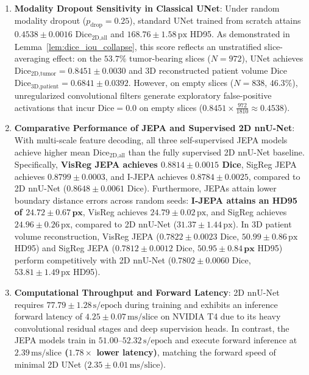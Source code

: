 \documentclass{article}
\begin{document}
\begin{enumerate}
    \item \textbf{Modality Dropout Sensitivity in Classical UNet}: Under random modality dropout ($p_{\text{drop}} = 0.25$), standard UNet trained from scratch attains $0.4538 \pm 0.0016$ $\text{Dice}_{\text{2D,all}}$ and $168.76 \pm 1.58\,\text{px}$ HD95. As demonstrated in Lemma~\ref{lem:dice_iou_collapse}, this score reflects an unstratified slice-averaging effect: on the $53.7\%$ tumor-bearing slices ($N=972$), UNet achieves $\text{Dice}_{\text{2D,tumor}} = 0.8451 \pm 0.0030$ and 3D reconstructed patient volume Dice $\text{Dice}_{\text{3D,patient}} = 0.6841 \pm 0.0392$. However, on empty slices ($N=838$, $46.3\%$), unregularized convolutional filters generate exploratory false-positive activations that incur $\text{Dice} = 0.0$ on empty slices ($0.8451 \times \frac{972}{1810} \approx 0.4538$).
    
    \item \textbf{Comparative Performance of JEPA and Supervised 2D nnU-Net}: With multi-scale feature decoding, all three self-supervised JEPA models achieve higher mean $\text{Dice}_{\text{2D,all}}$ than the fully supervised 2D nnU-Net baseline. Specifically, \textbf{VisReg JEPA achieves $\mathbf{0.8814 \pm 0.0015}$ Dice}, SigReg JEPA achieves $0.8799 \pm 0.0003$, and I-JEPA achieves $0.8784 \pm 0.0025$, compared to 2D nnU-Net ($0.8648 \pm 0.0061$ Dice). Furthermore, JEPAs attain lower boundary distance errors across random seeds: \textbf{I-JEPA attains an HD95 of $\mathbf{24.72 \pm 0.67\,\text{px}}$}, VisReg achieves $24.79 \pm 0.02\,\text{px}$, and SigReg achieves $24.96 \pm 0.26\,\text{px}$, compared to 2D nnU-Net ($31.37 \pm 1.44\,\text{px}$). In 3D patient volume reconstruction, VisReg JEPA ($\mathbf{0.7822 \pm 0.0023}$ Dice, $50.99 \pm 0.86\,\text{px}$ HD95) and SigReg JEPA ($0.7812 \pm 0.0012$ Dice, $\mathbf{50.95 \pm 0.84\,\text{px}}$ HD95) perform competitively with 2D nnU-Net ($0.7802 \pm 0.0060$ Dice, $53.81 \pm 1.49\,\text{px}$ HD95).
    
    \item \textbf{Computational Throughput and Forward Latency}: 2D nnU-Net requires $77.79 \pm 1.28\,\text{s/epoch}$ during training and exhibits an inference forward latency of $4.25 \pm 0.07\,\text{ms/slice}$ on NVIDIA T4 due to its heavy convolutional residual stages and deep supervision heads. In contrast, the JEPA models train in $51.00$--$52.32\,\text{s/epoch}$ and execute forward inference at \textbf{$2.39\,\text{ms/slice}$ ($1.78\times$ lower latency)}, matching the forward speed of minimal 2D UNet ($2.35 \pm 0.01\,\text{ms/slice}$).
    

\end{enumerate}
\end{document}
